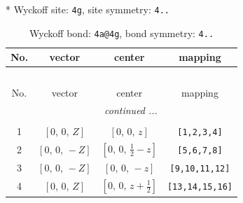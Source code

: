 \documentclass[fleqn,8pt]{jsarticle}
\begin{document}
* Wyckoff site: {\tt 4g}, site symmetry: {\tt 4..}
\renewcommand{\arraystretch}{1.2}
\begin{longtable}{cccc}
\caption{Wyckoff bond: {\tt 4a@4g}, bond symmetry: {\tt 4..}}
 \\
 \hline \hline
No. & vector & center & mapping \\ \hline \endfirsthead

\multicolumn{3}{l}{\tablename\ \thetable{}} \\
 \hline \hline
No. & vector & center & mapping \\ \hline \endhead

 \hline \hline
\multicolumn{3}{r}{\footnotesize\it continued ...} \\ \endfoot

 \hline \hline
\multicolumn{3}{r}{} \\ \endlastfoot

1 & $\left[ 0,\, 0,\, Z \right]$ & $\left[ 0,\, 0,\, z \right]$ & {\tt [1,2,3,4]} \\ \hline
2 & $\left[ 0,\, 0,\, - Z \right]$ & $\left[ 0,\, 0,\, \frac{1}{2} - z \right]$ & {\tt [5,6,7,8]} \\ \hline
3 & $\left[ 0,\, 0,\, - Z \right]$ & $\left[ 0,\, 0,\, - z \right]$ & {\tt [9,10,11,12]} \\ \hline
4 & $\left[ 0,\, 0,\, Z \right]$ & $\left[ 0,\, 0,\, z + \frac{1}{2} \right]$ & {\tt [13,14,15,16]} \\
\end{longtable}
\renewcommand{\arraystretch}{1.2}
\end{document}
